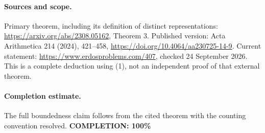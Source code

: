 \paragraph{Sources and scope.}
Primary theorem, including its definition of distinct representations:
\url{https://arxiv.org/abs/2308.05162}, Theorem 3.
Published version: Acta Arithmetica 214 (2024), 421--458,
\url{https://doi.org/10.4064/aa230725-14-9}.
Current statement: \url{https://www.erdosproblems.com/407},
checked 24 September 2026. This is a complete deduction using (1),
not an independent proof of that external theorem.

\paragraph{Completion estimate.}
The full boundedness claim follows from the cited theorem with the counting convention resolved.
\textbf{COMPLETION: 100\%}
